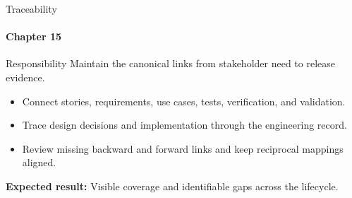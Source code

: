 \begin{frame}{Traceability}
\framesubtitle{Chapter 15}
\begin{block}{Responsibility}
Maintain the canonical links from stakeholder need to release evidence.
\end{block}
\begin{itemize}
  \item Connect stories, requirements, use cases, tests, verification, and validation.
  \item Trace design decisions and implementation through the engineering record.
  \item Review missing backward and forward links and keep reciprocal mappings aligned.
\end{itemize}
\vspace{0.15cm}
\textbf{Expected result:} Visible coverage and identifiable gaps across the lifecycle.
\end{frame}
